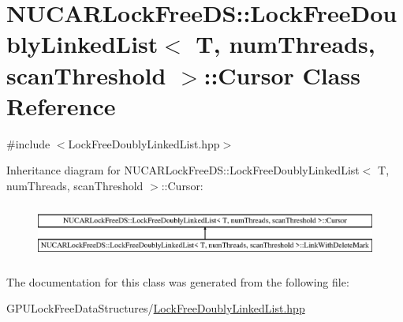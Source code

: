 \hypertarget{class_n_u_c_a_r_lock_free_d_s_1_1_lock_free_doubly_linked_list_1_1_cursor}{}\section{N\+U\+C\+A\+R\+Lock\+Free\+DS\+:\+:Lock\+Free\+Doubly\+Linked\+List$<$ T, num\+Threads, scan\+Threshold $>$\+:\+:Cursor Class Reference}
\label{class_n_u_c_a_r_lock_free_d_s_1_1_lock_free_doubly_linked_list_1_1_cursor}


{\ttfamily \#include $<$Lock\+Free\+Doubly\+Linked\+List.\+hpp$>$}

Inheritance diagram for N\+U\+C\+A\+R\+Lock\+Free\+DS\+:\+:Lock\+Free\+Doubly\+Linked\+List$<$ T, num\+Threads, scan\+Threshold $>$\+:\+:Cursor\+:\begin{figure}[H]
\begin{center}
\leavevmode
\includegraphics[height=1.839080cm]{class_n_u_c_a_r_lock_free_d_s_1_1_lock_free_doubly_linked_list_1_1_cursor}
\end{center}
\end{figure}


The documentation for this class was generated from the following file\+:\begin{DoxyCompactItemize}
\item 
G\+P\+U\+Lock\+Free\+Data\+Structures/\mbox{\hyperlink{_lock_free_doubly_linked_list_8hpp}{Lock\+Free\+Doubly\+Linked\+List.\+hpp}}\end{DoxyCompactItemize}
